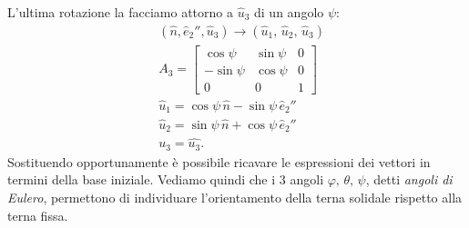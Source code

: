     L'ultima rotazione la facciamo attorno a $\hat{u}_3$ di un angolo $\psi$:
    \begin{equation}
    \begin{aligned}
        &(\hat{n}, \hat{e}_2'', \hat{u}_3) \to (\hat{u}_1,\,\hat{u}_2,\,\hat{u}_3)\\
        &A_3 = 
        \begin{bmatrix}
            \cos \psi & \sin \psi & 0\\
            -\sin \psi &\cos \psi & 0 \\
            0 & 0 & 1
        \end{bmatrix}\\
        &\hat{u}_1 = \cos \psi\,\hat{n}-\sin \psi\,\hat{e}_2''\\
        &\hat{u}_2 = \sin \psi\,\hat{n}+\cos \psi\,\hat{e}_2''\\
        &\hat{u_3} = \hat{u_3}.
    \end{aligned}
    \end{equation}
     Sostituendo opportunamente è possibile ricavare le espressioni dei vettori in termini della base iniziale. Vediamo quindi che i $3$ angoli $\varphi,\,\theta,\,\psi$, detti \emph{angoli di Eulero}, permettono di individuare l'orientamento della terna solidale rispetto alla terna fissa. 

